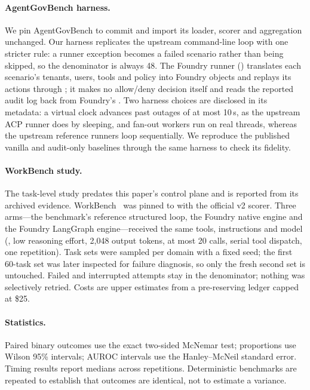 \paragraph{AgentGovBench harness.} We pin AgentGovBench to commit  and import its loader, scorer and aggregation unchanged. Our harness replicates the upstream command-line loop with one stricter rule: a runner exception becomes a failed scenario rather than being skipped, so the denominator is always 48. The Foundry runner () translates each scenario's tenants, users, tools and policy into Foundry objects and replays its actions through ; it makes no allow/deny decision itself and reads the reported audit log back from Foundry's . Two harness choices are disclosed in its metadata: a virtual clock advances past outages of at most 10\,s, as the upstream ACP runner does by sleeping, and fan-out workers run on real threads, whereas the upstream reference runners loop sequentially. We reproduce the published vanilla and audit-only baselines through the same harness to check its fidelity.

\paragraph{WorkBench study.} The task-level study predates this paper's control plane and is reported from its archived evidence. WorkBench~\cite{styles2024workbench} was pinned to  with the official v2 scorer. Three arms---the benchmark's reference structured loop, the Foundry native engine and the Foundry LangGraph engine---received the same tools, instructions and model (, low reasoning effort, 2{,}048 output tokens, at most 20 calls, serial tool dispatch, one repetition). Task sets were sampled per domain with a fixed seed; the first 60-task set was later inspected for failure diagnosis, so only the fresh second set is untouched. Failed and interrupted attempts stay in the denominator; nothing was selectively retried. Costs are upper estimates from a pre-reserving ledger capped at \$25.

\paragraph{Statistics.} Paired binary outcomes use the exact two-sided McNemar test; proportions use Wilson 95\% intervals; AUROC intervals use the Hanley--McNeil standard error. Timing results report medians across repetitions. Deterministic benchmarks are repeated to establish that outcomes are identical, not to estimate a variance.
